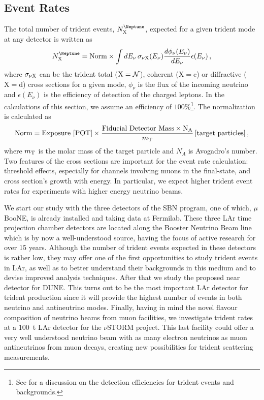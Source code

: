 \subsection{Event Rates}
\label{subsec:rates}

The total number of trident events, $N^{\text{\Neptune}}_{\rm X}$, expected for a given trident mode at any detector is written as  
\begin{eqnarray}
\label{eq:nevents}
N^{\text{\Neptune}}_{\rm X}={\rm Norm}\times\int dE_\nu \, \sigma_{\nu {\rm X}}(E_\nu) \frac{d\phi_{\nu}(E_\nu)}{dE_\nu}\epsilon(E_\nu)\,,
\end{eqnarray}
where $\sigma_{\nu {\rm X}}$ can be the trident total (${\rm X}={\cal N}$), coherent ($\mathrm{X=c}$) or diffractive ($\mathrm{X=d}$) cross sections 
for a given mode, $\phi_{\nu}$ is the flux of the incoming neutrino and $\epsilon(E_\nu)$ is the efficiency of detection of the charged leptons. In the calculations of this section, we assume an efficiency of $100\%$\footnote{See  for a discussion on the detection efficiencies for trident events and backgrounds.}.
%
The normalization is calculated as 
$${\rm Norm}= {\rm{Exposure}}~[{\rm{POT}}] \times \frac{{\rm{Fiducial~Detector~Mass}\times N_A}}{m_{\rm T}} \left[{\rm{target~particles}}\right],$$
where $m_{\rm T}$ is the molar mass of the target particle and $N_A$ is Avogadro's number.
%
Two features of the cross sections are important for the event rate calculation: 
threshold effects, especially for channels involving muons in the final-state,
and cross section's growth with energy. In particular, we expect higher trident event rates for experiments with higher energy neutrino beams. 

We start our study with the three detectors of the SBN program, one of which, $\mu$BooNE, is already installed and taking data at Fermilab. These three LAr time projection chamber detectors are located along the Booster Neutrino Beam line which is by now a well-understood source, having the focus of active research for over 15 years. 
%
Although the number of trident events expected in these detectors is rather low, they may offer one of the first opportunities to study trident events in LAr, as well as to better understand their backgrounds in this medium and to devise improved analysis techniques.
%
After that we study the proposed near detector for DUNE. This turns out to be the most important LAr detector for trident production since it will provide the highest number of events in both neutrino and antineutrino modes. 
%
Finally, having in mind the novel flavour composition of neutrino beams from muon facilities, we investigate trident rates at a 100~t LAr detector for the $\nu$STORM project. This last facility could offer a very well understood neutrino beam with as many electron neutrinos as muon antineutrinos from muon decays, creating new possibilities for trident scattering measurements.

